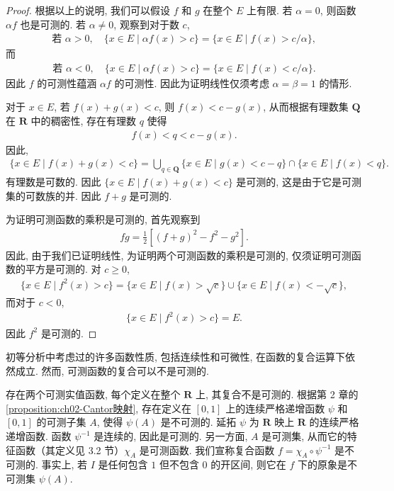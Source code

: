 \documentclass[../../main.tex]{subfiles}
\begin{document}
\begin{proof}
根据以上的说明, 我们可以假设 $f$ 和 $g$ 在整个 $E$ 上有限. 若 $\alpha=0$, 则函数 $\alpha f$ 也是可测的. 若 $\alpha\neq 0$, 观察到对于数 $c$,
\begin{align*}
\text{若 }\alpha>0,\quad\{x\in E\mid\alpha f(x)>c\}=\{x\in E\mid f(x)>c/\alpha\},
\end{align*}
而
\begin{align*}
\text{若 }\alpha<0,\quad\{x\in E\mid\alpha f(x)>c\}=\{x\in E\mid f(x)<c/\alpha\}.
\end{align*}
因此 $f$ 的可测性蕴涵 $\alpha f$ 的可测性. 因此为证明线性仅须考虑 $\alpha=\beta=1$ 的情形.

对于 $x\in E$, 若 $f(x)+g(x)<c$, 则 $f(x)<c-g(x)$, 从而根据有理数集 $\mathbf{Q}$ 在 $\mathbf{R}$ 中的稠密性, 存在有理数 $q$ 使得
\begin{align*}
f(x)<q<c-g(x).
\end{align*}
因此,
\begin{align*}
\{x\in E\mid f(x)+g(x)<c\}=\bigcup_{q\in\mathbf{Q}}\{x\in E\mid g(x)<c-q\}\cap\{x\in E\mid f(x)<q\}.
\end{align*}
有理数是可数的. 因此 $\{x\in E\mid f(x)+g(x)<c\}$ 是可测的, 这是由于它是可测集的可数族的并. 因此 $f+g$ 是可测的.

为证明可测函数的乘积是可测的, 首先观察到
\begin{align*}
fg=\frac{1}{2}\left[(f+g)^{2}-f^{2}-g^{2}\right].
\end{align*}
因此, 由于我们已证明线性, 为证明两个可测函数的乘积是可测的, 仅须证明可测函数的平方是可测的. 对 $c\geqslant 0$,
\begin{align*}
\{x\in E\mid f^{2}(x)>c\}=\{x\in E\mid f(x)>\sqrt{c}\}\cup\{x\in E\mid f(x)<-\sqrt{c}\},
\end{align*}
而对于 $c<0$,
\begin{align*}
\{x\in E\mid f^{2}(x)>c\}=E.
\end{align*}
因此 $f^{2}$ 是可测的.
\end{proof}

初等分析中考虑过的许多函数性质, 包括连续性和可微性, 在函数的复合运算下依然成立. 然而, 可测函数的复合可以不是可测的.

\begin{example}\label{example:ch03-复合不可测}
存在两个可测实值函数, 每个定义在整个 $\mathbf{R}$ 上, 其复合不是可测的. 根据第 2 章的\cref{proposition:ch02-Cantor映射}, 存在定义在 $[0,1]$ 上的连续严格递增函数 $\psi$ 和 $[0,1]$ 的可测子集 $A$, 使得 $\psi(A)$ 是不可测的. 延拓 $\psi$ 为 $\mathbf{R}$ 映上 $\mathbf{R}$ 的连续严格递增函数. 函数 $\psi^{-1}$ 是连续的, 因此是可测的. 另一方面, $A$ 是可测集, 从而它的特征函数（其定义见 3.2 节）$\chi_{A}$ 是可测函数. 我们宣称复合函数 $f=\chi_{A}\circ\psi^{-1}$ 是不可测的. 事实上, 若 $I$ 是任何包含 $1$ 但不包含 $0$ 的开区间, 则它在 $f$ 下的原象是不可测集 $\psi(A)$.
\end{example}
\end{document}
